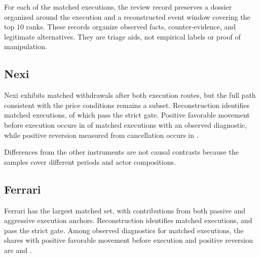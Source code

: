 \documentclass[11pt]{article}
\newenvironment{review}{\begingroup\color{blue}}{\endgroup}
\begin{document}
For each of the \RisanamentoMatchedClusters{} matched executions, the review record preserves \begin{review}a dossier organized around the execution and a reconstructed event window covering the top $10$ ranks\end{review}. These records organize observed facts, counter-evidence, and legitimate alternatives.
They are triage aids, not empirical labels or proof of manipulation.

\subsection{Nexi}
\label{subsec:nexi_results}

Nexi exhibits matched withdrawals after both execution routes, but \begin{review}the full path consistent with the price conditions\end{review} remains a subset.
Reconstruction identifies \NexiMatchedClusters{} matched executions, of which \NexiCompatibleSequences{} pass the strict gate.
Positive \begin{review}favorable movement before execution\end{review} occurs in \NexiFPMShare{} of matched executions with an observed diagnostic, while
\begin{review}positive reversion measured from cancellation\end{review} occurs in \NexiREVShare{}.

Differences from the other instruments are not causal contrasts because the samples cover different periods and actor
compositions.

\subsection{Ferrari}
\label{subsec:ferrari_results}

Ferrari has the largest matched set, with contributions from both passive and aggressive execution anchors.
Reconstruction identifies \FerrariMatchedClusters{} matched executions, and \FerrariCompatibleSequences{} pass the strict
gate. Among \begin{review}observed diagnostics for matched executions\end{review}, the shares with \begin{review}positive favorable movement before execution\end{review} and positive
reversion are \FerrariFPMShare{} and \FerrariREVShare{}.
\end{document}
